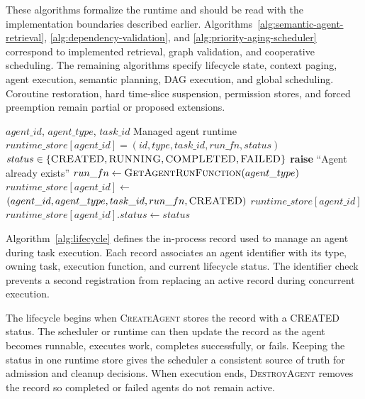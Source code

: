 These algorithms formalize the runtime and should be read with the implementation boundaries described earlier. Algorithms~\ref{alg:semantic-agent-retrieval}, \ref{alg:dependency-validation}, and \ref{alg:priority-aging-scheduler} correspond to implemented retrieval, graph validation, and cooperative scheduling. The remaining algorithms specify lifecycle state, context paging, agent execution, semantic planning, DAG execution, and global scheduling. Coroutine restoration, hard time-slice suspension, permission stores, and forced preemption remain partial or proposed extensions.
\vspace{\baselineskip}

\begin{algorithm}[H]
\caption{Agent Lifecycle Management}
\label{alg:lifecycle}
\begin{algorithmic}[1]
\Require $agent\_id$, $agent\_type$, $task\_id$
\Ensure Managed agent runtime
\State $runtime\_store[agent\_id] = (id,type,task\_id,run\_fn,status)$
\State $status \in \{\textsc{CREATED},\textsc{RUNNING},\textsc{COMPLETED},\textsc{FAILED}\}$
        \State \textbf{raise} ``Agent already exists''
    \EndIf
    \State $run\_fn \gets \Call{GetAgentRunFunction}{agent\_type}$
    \State $runtime\_store[agent\_id] \gets$
    \Statex \hspace{\algorithmicindent}$(agent\_id,agent\_type,task\_id,run\_fn,\textsc{CREATED})$
    \State \Return $runtime\_store[agent\_id]$
\EndFunction
{}
    \State $runtime\_store[agent\_id].status \gets status$
\EndFunction
{}
    \State {}
\EndFunction
\end{algorithmic}
\end{algorithm}
\vspace{\baselineskip}
Algorithm~\ref{alg:lifecycle} defines the in-process record used to manage an agent during task execution. Each record associates an agent identifier with its type, owning task, execution function, and current lifecycle status. The identifier check prevents a second registration from replacing an active record during concurrent execution.

The lifecycle begins when \textsc{CreateAgent} stores the record with a CREATED status. The scheduler or runtime can then update the record as the agent becomes runnable, executes work, completes successfully, or fails. Keeping the status in one runtime store gives the scheduler a consistent source of truth for admission and cleanup decisions. When execution ends, \textsc{DestroyAgent} removes the record so completed or failed agents do not remain active.

